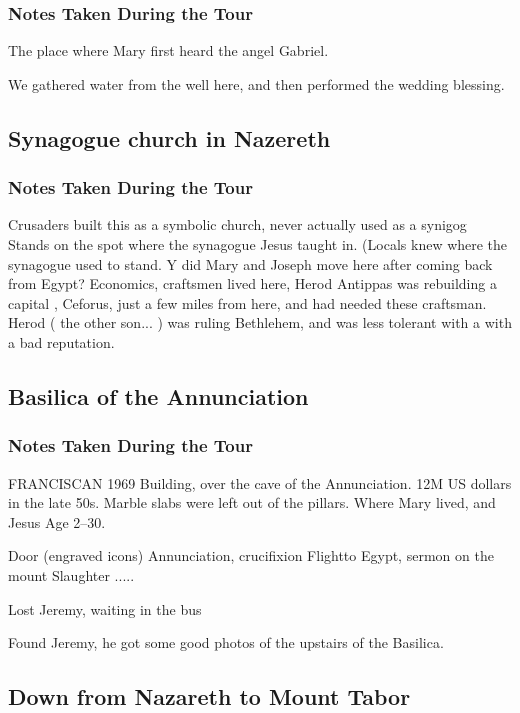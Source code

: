 \documentclass[letterpaper]{report}
\begin{document}
\subsubsection{Notes Taken During the Tour}
The place where Mary first heard the angel Gabriel.

We gathered water from the well here,
and then performed the wedding blessing.

\clearpage
\subsection{Synagogue church in Nazereth}
\begin{multicols}{2}
	\mbox{}
\end{multicols}
\subsubsection{Notes Taken During the Tour}
Crusaders built this as a symbolic church, never actually used as a synigog
Stands on the spot where the synagogue Jesus taught in. (Locals knew where the synagogue used to stand.
Y did Mary and Joseph move here after coming back from Egypt? Economics, craftsmen lived here, Herod Antippas was rebuilding a capital , Ceforus, just a few miles from here, and had needed these craftsman. Herod ( the other son... ) was ruling Bethlehem, and was less tolerant with a with a bad reputation.

\clearpage
\subsection{Basilica of the Annunciation}
\begin{multicols}{2}
	\mbox{}
\end{multicols}
\subsubsection{Notes Taken During the Tour}
FRANCISCAN
1969 Building, over the cave of the Annunciation.
12M US dollars in the late 50s. Marble slabs were left out of the pillars.
Where Mary lived, and Jesus Age 2--30.

Door (engraved icons)
Annunciation, crucifixion
Flightto Egypt, sermon on the mount
Slaughter .....

Lost Jeremy, waiting in the bus

Found Jeremy, he got some good photos of the upstairs of the Basilica.

\clearpage
\subsection{Down from Nazareth to Mount Tabor}
\begin{multicols}{2}
  \mbox{}
\end{multicols}
\end{document}
